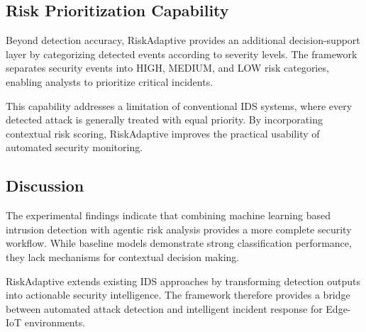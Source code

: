 \subsection{Risk Prioritization Capability}

Beyond detection accuracy, RiskAdaptive provides an additional
decision-support layer by categorizing detected events according to
severity levels. The framework separates security events into HIGH,
MEDIUM, and LOW risk categories, enabling analysts to prioritize
critical incidents.

This capability addresses a limitation of conventional IDS systems,
where every detected attack is generally treated with equal priority.
By incorporating contextual risk scoring, RiskAdaptive improves the
practical usability of automated security monitoring.


\subsection{Discussion}

The experimental findings indicate that combining machine learning
based intrusion detection with agentic risk analysis provides a more
complete security workflow. While baseline models demonstrate strong
classification performance, they lack mechanisms for contextual
decision making.

RiskAdaptive extends existing IDS approaches by transforming detection
outputs into actionable security intelligence. The framework therefore
provides a bridge between automated attack detection and intelligent
incident response for Edge-IoT environments.
